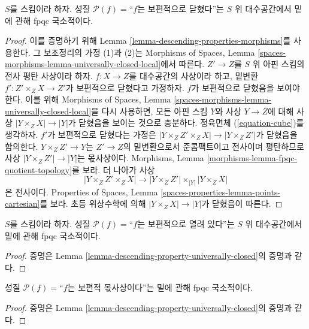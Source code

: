 \begin{lemma}
\label{lemma-descending-property-universally-closed}
$S$를 스킴이라 하자. 성질 $\mathcal{P}(f)=$``$f$는 보편적으로
닫혔다''는 $S$ 위 대수공간에서 밑에 관해 fpqc 국소적이다.
\end{lemma}

\begin{proof}
이를 증명하기 위해 Lemma \ref{lemma-descending-properties-morphisms}를
사용한다. 그 보조정리의 가정 (1)과 (2)는 Morphisms of Spaces, Lemma
\ref{spaces-morphisms-lemma-universally-closed-local}에서 따른다.
$Z'\to Z$를 $S$ 위 아핀 스킴의 전사 평탄 사상이라 하자. $f:X\to Z$를
대수공간의 사상이라 하고, 밑변환 $f':Z'\times_ZX\to Z'$가
보편적으로 닫혔다고 가정하자. $f$가 보편적으로 닫혔음을 보여야 한다.
이를 위해 Morphisms of Spaces, Lemma
\ref{spaces-morphisms-lemma-universally-closed-local}을 다시 사용하면, 모든
아핀 스킴 $Y$와 사상 $Y\to Z$에 대해 사상
$|Y\times_ZX|\to|Y|$가 닫혔음을 보이는 것으로 충분하다. 정육면체
(\ref{equation-cube})를 생각하자. $f'$가 보편적으로 닫혔다는 가정은
$|Y\times_ZZ'\times_ZX|\to|Y\times_ZZ'|$가 닫혔음을 함의한다.
$Y\times_ZZ'\to Y$는 $Z'\to Z$의 밑변환으로서 준콤팩트이고 전사이며
평탄하므로 사상 $|Y\times_ZZ'|\to|Y|$는 몫사상이다. Morphisms,
Lemma \ref{morphisms-lemma-fpqc-quotient-topology}를 보라. 더 나아가 사상
$$
|Y \times_Z Z' \times_Z X|
\longrightarrow
|Y \times_Z Z'| \times_{|Y|} |Y \times_Z X|
$$
은 전사이다. Properties of Spaces, Lemma
\ref{spaces-properties-lemma-points-cartesian}를 보라. 초등 위상수학에 의해
$|Y\times_ZX|\to|Y|$가 닫혔음이 따른다.
\end{proof}

\begin{lemma}
\label{lemma-descending-property-universally-open}
$S$를 스킴이라 하자. 성질 $\mathcal{P}(f)=$``$f$는 보편적으로
열려 있다''는 $S$ 위 대수공간에서 밑에 관해 fpqc 국소적이다.
\end{lemma}

\begin{proof}
증명은 Lemma \ref{lemma-descending-property-universally-closed}의 증명과
같다.
\end{proof}

\begin{lemma}
\label{lemma-descending-property-universally-submersive}
성질 $\mathcal{P}(f)=$``$f$는 보편적 몫사상이다''는 밑에 관해 fpqc
국소적이다.
\end{lemma}

\begin{proof}
증명은 Lemma \ref{lemma-descending-property-universally-closed}의 증명과
같다.
\end{proof}

